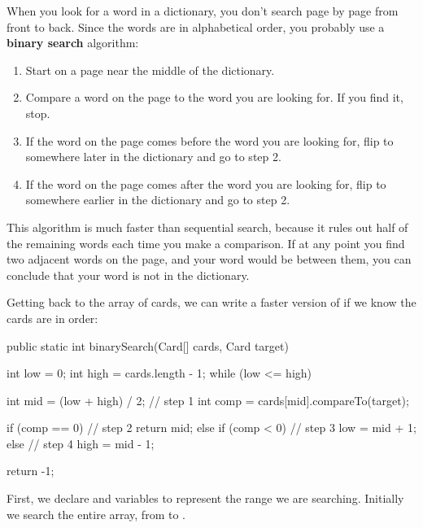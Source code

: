 
When you look for a word in a dictionary, you don't search page by page from front to back.
Since the words are in alphabetical order, you probably use a {\bf binary search} algorithm:

\begin{enumerate}

\item Start on a page near the middle of the dictionary.

\item Compare a word on the page to the word you are looking for.
If you find it, stop.

\item If the word on the page comes before the word you are looking for, flip to somewhere later in the dictionary and go to step 2.

\item If the word on the page comes after the word you are looking for, flip to somewhere earlier in the dictionary and go to step 2.

\end{enumerate}

This algorithm is much faster than sequential search, because it rules out half of the remaining words each time you make a comparison.
If at any point you find two adjacent words on the page, and your word would be between them, you can conclude that your word is not in the dictionary.

Getting back to the array of cards, we can write a faster version of  if we know the cards are in order:

\begin{code}
public static int binarySearch(Card[] cards, Card target) {
    int low = 0;
    int high = cards.length - 1;
    while (low <= high) {
        int mid = (low + high) / 2;                 // step 1
        int comp = cards[mid].compareTo(target);

        if (comp == 0) {                            // step 2
            return mid;
        } else if (comp < 0) {                      // step 3
            low = mid + 1;
        } else {                                    // step 4
            high = mid - 1;
        }
    }
    return -1;
}
\end{code}

First, we declare  and  variables to represent the range we are searching.
Initially we search the entire array, from  to .

